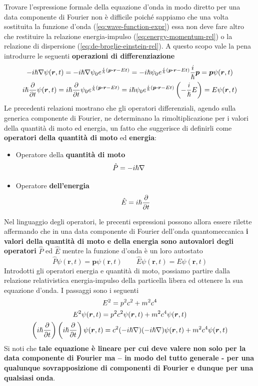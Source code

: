 Trovare l'espressione formale della equazione d'onda in modo diretto per
una data componente di Fourier non è difficile poiché sappiamo che una
volta sostituita la funzione d'onda (\ref{eq:wave-function-expr}) essa non deve fare altro
che restituire la relazione energia-impulso (\ref{eq:energy-momentum-rel}) o la relazione di
dispersione (\ref{eq:de-broglie-einstein-rel}).
A questo scopo vale la pena introdurre le seguenti \textbf{operazioni di differenziazione}
\begin{gather*}
	- i \hp \nabla \psi (\bm{r},t) = - i \hp \nabla \psi_{0} e ^{\frac{i}{\hp}(\bm{p \cdot r}-E t)} =
	- i \hp \psi_{0} e^{\frac{i}{\hp}(\bm{p \cdot r}-E t)} \frac{i}{\hp} \bm{p} = \bm{p}\psi(\bm{r},t)\\
	i \hp \frac{\partial}{\partial t} \psi (\bm{r},t) =
	i \hp \frac{\partial}{\partial t} \psi_{0} e^{\frac{i}{\hp}(\bm{p \cdot r}-E t)} =
	i \hp \psi_{0} e^{\frac{i}{\hp}(\bm{p \cdot r}-E t)} \left( - \frac{i}{\hp} E\right) = E\psi(\bm{r},t)
	\label{eq:differential-operators-qm}
\end{gather*}
Le precedenti relazioni mostrano che gli operatori differenziali, agendo
sulla generica componente di Fourier, ne determinano la
rimoltiplicazione per i valori della quantità di moto ed energia, un
fatto che suggerisce di definirli come \textbf{operatori della quantità
di moto} ed \textbf{energia}:
\begin{itemize}
	\item Operatore della \textbf{quantità di moto}
	\[
	   \hat{P} = - i \hslash \nabla    \qquad
	\]
	\item Operatore \textbf{dell'energia}
	\[
		\hat{E} = i \hslash \frac{\partial}{\partial t}
	\]
\end{itemize}
Nel linguaggio degli operatori, le precenti espressioni possono allora
essere rilette affermando che in una data componente di Fourier
dell'onda quantomeccanica \textbf{i valori della quantità di moto e
della energia sono autovalori degli operatori} \(\hat{P}\) ed
\(\hat{E}\) mentre la funzione d'onda è un loro autostato
\[
	\hat{P}\psi(\bm{r},t) = \bm{p}\psi(\bm{r},t) \qquad
	\hat{E}\psi(\bm{r},t) = E\psi(\bm{r},t)
\]
Introdotti gli operatori energia e quantità di moto, possiamo
partire dalla relazione relativistica energia-impulso della particella
libera ed ottenere la sua equazione d'onda.
I passaggi sono i seguenti
\begin{gather*}
	E^2 = p^2c^2 + m^2c^4\\
	E^2\psi(\bm{r},t) = p^2c^2\psi(\bm{r},t)+m^2c^4\psi(\bm{r},t)\\
	\left( i \hslash \frac{\partial}{\partial t}\right)\left( i \hslash \frac{\partial}{\partial t}\right)\psi(\bm{r},t) = c^2 (-i \hslash \nabla)(-i \hslash \nabla)\psi(\bm{r},t)+m^2c^4 \psi(\bm{r},t)
\end{gather*}
Si noti che \textbf{tale equazione è lineare per cui deve valere non
solo per la data componente di Fourier ma -- in modo del tutto generale
- per una qualunque sovrapposizione di componenti di Fourier e dunque
per una qualsiasi onda}.

